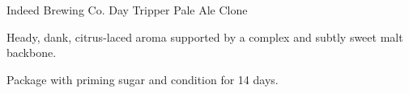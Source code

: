 \begin{recipe}{Indeed Brewing Co. Day Tripper Pale Ale Clone} %

\begin{aboutblock}
Heady, dank, citrus-laced aroma supported by a complex and subtly sweet
malt backbone. \sourceaha
\end{aboutblock}


\begin{methodandtiming}
 
\begin{mashsteps}
\end{mashsteps}

\begin{fermentationsteps}
\end{fermentationsteps}

\begin{directions}
Package with  priming sugar and condition for 14 days.
\end{directions}

\end{methodandtiming}

\recipebreak

\begin{ingredientsblock}

\begin{malts}

\end{malts}

\begin{hops}
\end{hops}


\end{ingredientsblock}

\end{recipe}


